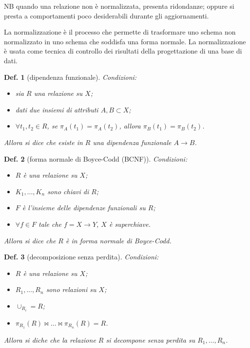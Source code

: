 \documentclass{article}
\newtheorem{definition}{Def.}[section]
\begin{document}
NB quando una relazione non è normalizzata, presenta ridondanze; oppure si presta
a comportamenti poco desiderabili durante gli aggiornamenti.

La normalizzazione è il processo che permette di trasformare uno schema non
normalizzato in uno schema che soddisfa una forma normale. La normalizzazione è
usata come tecnica di controllo dei risultati della progettazione di una base di
dati.

\begin{definition}[dipendenza funzionale]
	Condizioni:
	\begin{itemize}
		\item sia $R$ una relazione su $X$;

		\item dati due insiemi di attributi $A, B \subset X$;

		\item $\forall t_1, t_2 \in R$, se $\pi_A(t_1) = \pi_A(t_2)$, allora
			$\pi_B(t_1) = \pi_B(t_2)$.
	\end{itemize}

	Allora si dice che esiste in $R$ una dipendenza funzionale $A 
	\rightarrow B$.
\end{definition}

\begin{definition}[forma normale di Boyce-Codd (BCNF)]
	Condizioni:
	\begin{itemize}
		\item $R$ è una relazione su $X$;

		\item $K_1, \dots, K_n$ sono chiavi di $R$;

		\item $F$ è l'insieme delle dipendenze funzionali su $R$;

		\item $\forall f \in F$ tale che $f = X \rightarrow Y$, $X$ è 
			superchiave.
	\end{itemize}

	Allora si dice che $R$ è in forma normale di Boyce-Codd.
\end{definition}

\begin{definition}[decomposizione senza perdita]
	Condizioni:
	\begin{itemize}
		\item $R$ è una relazione su $X$;

		\item $R_1, \dots, R_n$ sono relazioni su $X$;

		\item $\cup_{R_i} = R$;

		\item $\pi_{R_1}(R) \bowtie \dots \bowtie \pi_{R_n}(R) = R$.
	\end{itemize}

	Allora si diche che la relazione $R$ si decompone senza perdita su $R_1,
	\dots, R_n$.
\end{definition}
\end{document}
